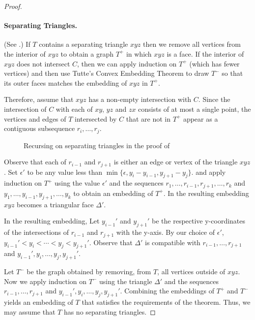 \documentclass{patmorin}
\begin{document}
\begin{proof}
   \paragraph{Separating Triangles.}
   (See .)
   If $T$ contains a separating triangle $xyz$ then we remove all vertices
   from the interior of $xyz$ to obtain a graph $T^+$ in which $xyz$
   is a face.  If the interior of $xyz$ does not intersect $C$, then
   we can apply induction on $T^+$ (which has fewer vertices) and then
   use Tutte's Convex Embedding Theorem to draw $T^-$ so that its outer
   faces matches the embedding of $xyz$ in $T^+$.

   Therefore, assume that $xyz$ has a non-empty intersection with $C$.
   Since the intersection of $C$ with each of $xy$, $yz$ and $zx$
   consists of at most a single point, the vertices and edges of $T$
   intersected by $C$ that are not in $T^+$ appear as a contiguous
   subsequence $r_i,\ldots,r_j$.

   \begin{figure}
      \caption{Recursing on separating triangles in the proof of
      }
   \end{figure}

   Observe that each of $r_{i-1}$ and $r_{j+1}$ is either an edge
   or vertex of the triangle $xyz$.  Set $\epsilon'$ to be any
   value less than $\min\{\epsilon,y_{i}-y_{i-1}, y_{j+1}-y_j\}$.
   and apply induction on $T^+$ using the value $\epsilon'$
   and the sequences $r_1,\ldots,r_{i-1},r_{j+1},\ldots,r_k$ and
   $y_1,\ldots,y_{i-1},y_{j+1},\ldots,y_k$ to obtain an embedding
   of $T^+$.  In the resulting embedding $xyz$ becomes a triangular face
   $\Delta'$.

   In the resulting embedding, Let $y_{i-1}'$ and $y_{j+1}'$
   be the respective y-coordinates of the intersections of
   $r_{i-1}$ and $r_{j+1}$ with the y-axis.  By our choice of
   $\epsilon'$, $y_{i-1}'<y_i<\cdots<y_j<y_{j+1}'$.  Observe that
   $\Delta'$ is compatible with $r_{i-1},\ldots,r_{j+1}$ and
   $y_{i-1}',y_i,\ldots,y_j,y_{j+1}'$.

   Let $T^-$ be the graph obtained by removing, from $T$, all
   vertices outside of $xyz$.  Now we apply induction on $T^-$ using
   the triangle $\Delta'$ and the sequences $r_{i-1},\ldots,r_{j+1}$ and
   $y_{i-1}',y_i,\ldots,y_{j},y_{j+1}'$.  Combining the embeddings of $T^+$
   and $T^-$ yields an embedding of $T$ that satisfies the requirements of
   the theorem.  Thus, we may assume that $T$ has no separating triangles.


\end{proof}
\end{document}
